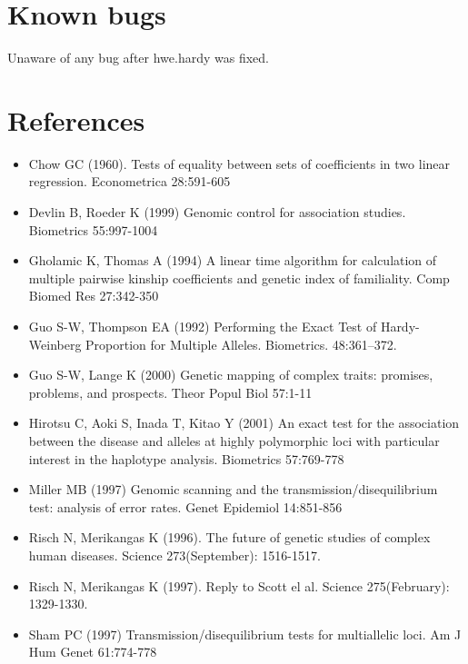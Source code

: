 \documentclass[10pt,a4paper]{article}
\begin{document}
\section{Known bugs}

Unaware of any bug after hwe.hardy was fixed.


\section{References}
\begin{itemize}
\item[] 
Chow GC (1960). Tests of equality between sets of coefficients in two
linear regression. Econometrica 28:591-605

\item[] 
Devlin B, Roeder K (1999) Genomic control for association studies. 
Biometrics 55:997-1004

\item[] 
Gholamic K, Thomas A (1994) A linear time algorithm for calculation of
multiple pairwise kinship coefficients and genetic index of familiality.
Comp Biomed Res 27:342-350

\item[] 
Guo S-W, Thompson EA (1992) Performing the Exact Test of
Hardy-Weinberg Proportion for Multiple Alleles. Biometrics. 48:361--372.

\item[] 
Guo S-W, Lange K (2000) Genetic mapping of complex traits: promises, problems, 
and prospects. Theor Popul Biol 57:1-11

\item[] 
Hirotsu C, Aoki S, Inada T, Kitao Y (2001) An exact test for the association
between the disease and alleles at highly polymorphic loci with particular interest
in the haplotype analysis. Biometrics 57:769-778

\item[] 
Miller MB (1997) Genomic scanning and the transmission/disequilibrium test:
analysis of error rates. Genet Epidemiol 14:851-856

\item[] 
Risch N, Merikangas K (1996). The future of genetic studies of
complex human diseases. Science 273(September): 1516-1517.
 
\item[] 
Risch N, Merikangas K (1997). Reply to Scott el al. Science
275(February): 1329-1330. 

\item[] 
Sham PC (1997) Transmission/disequilibrium tests for multiallelic loci.
Am J Hum Genet 61:774-778


\end{itemize}
\end{document}
